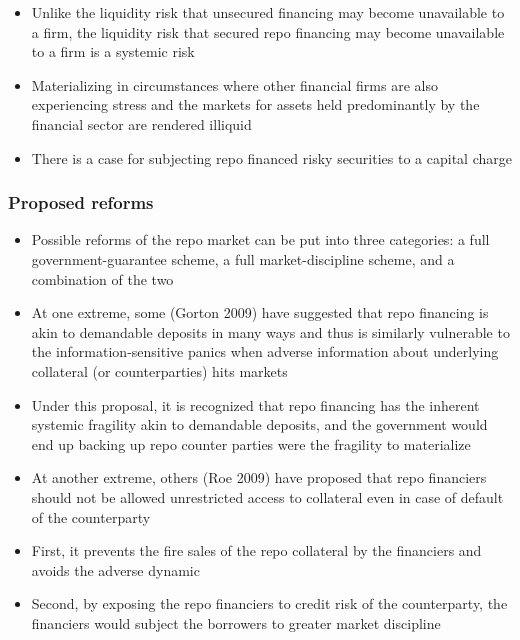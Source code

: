 \documentclass[11pt]{beamer}
\begin{document}
\begin{frame}
\begin{itemize}
\item Unlike the liquidity risk that unsecured financing may become unavailable to a firm, the liquidity risk that secured repo financing may become unavailable to a firm is a systemic risk
\item Materializing in circumstances where other financial firms are also experiencing stress and the markets for assets held predominantly by the financial sector are rendered illiquid
\item There is a case for subjecting repo financed risky securities to a capital charge
\end{itemize}
\end{frame}

\begin{frame}
\frametitle{Proposed reforms}
\begin{itemize}
\item Possible reforms of the repo market can be put into three categories: a full government-guarantee scheme, a full market-discipline scheme, and a combination of the two
\item At one extreme, some (Gorton 2009) have suggested that repo financing is akin to demandable deposits in many ways and thus is similarly vulnerable to the information-sensitive panics when adverse information about underlying collateral (or counterparties) hits markets
\item Under this proposal, it is recognized that repo financing has the inherent systemic fragility akin to demandable deposits, and the government would end up backing up repo counter parties were the fragility to materialize
\end{itemize}
\end{frame}

\begin{frame}
\begin{itemize}
\item At another extreme, others (Roe 2009) have proposed that repo financiers should not be allowed unrestricted access to collateral even in case of default of the counterparty
\item First, it prevents the fire sales of the repo collateral by the financiers and avoids the adverse dynamic
\item Second, by exposing the repo financiers to credit risk of the counterparty, the financiers would subject the borrowers to greater market discipline
\end{itemize}
\end{frame}
\end{document}
